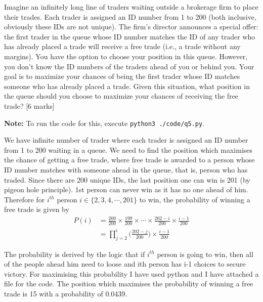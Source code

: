 \begin{que}
	Imagine an infinitely long line of traders waiting outside a brokerage
	firm to place their trades. Each trader is assigned an ID number from 1
	to 200 (both inclusive, obviously these IDs are not unique). The firm’s
	director announces a special offer: the first trader in the queue whose
	ID number matches the ID of any trader who has already placed a trade
	will receive a free trade (i.e., a trade without any margins). You have
	the option to choose your position in this queue.   However, you don’t
	know the ID numbers of the traders ahead of you or behind you. Your
	goal is to maximize your chances of being the first trader whose ID
	matches someone who has already placed a trade. Given this situation,
	what position in the queue should you choose to maximize your chances
	of receiving the free trade?
	\hspace*{\fill} [6 marks]
\end{que}
\begin{tcolorbox}[breakable]
	\begin{sol}
		\textbf{Note:} To run the code for this, execute \texttt{python3 ./code/q5.py}.

		We have infinite number of trader where each trader is assigned
		an ID number from 1 to 200 waiting in a queue. We need to find
		the position which maximises the chance of getting a free
		trade, where free trade is awarded to a person whose ID number
		matches with someone ahead in the queue, that is, person who
		has traded. Since there are 200 unique IDs, the last position
		one can win is 201 (by pigeon hole principle). 1st person can
		never win as it has no one ahead of him. Therefore for $i^{th}$
		person $i \in \{2,3,4,\cdots,201 \}$ to win, the probability of
		winning a free trade is given by
		\begin{align}
			P(i) & = \frac{200}{200} \times \frac{199}{200} \times \cdots \times \frac{202 - i}{200} \times \frac{i-1}{200} \\
			     & = \prod_{j=2}^{i} \Bigg( \frac{202 - j}{200} \Bigg) \times \frac{i - 1}{200}
		\end{align}

		The probability is derived by the logic that if $i^{th}$ person
		is going to win, then all of the people ahead him need to loose
		and ith person has i-1 choices to secure victory. For maximising
		this probability I have used python and I have attached a file
		for the code. The position which maximises the probability of
		winning a free trade is 15 with a probability of 0.0439.

	\end{sol}
\end{tcolorbox}
